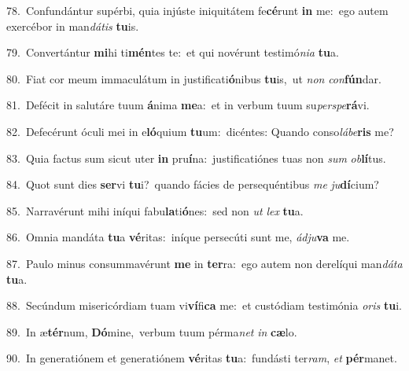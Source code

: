 {\numbfont\textcolor{\numbcolor}{78.}}~Confundántur supérbi, quia injúste iniquitátem fe\-\textbf{cé}\-runt \textbf{in} me:~\star ego autem exercébor in man\-\textit{dá}\-\textit{tis} \textbf{tu}\-is.\par
{\numbfont\textcolor{\numbcolor}{79.}}~Convertántur \textbf{mi}\-hi ti\-\textbf{mén}\-tes te:~\star et qui novérunt testimó\-\textit{ni}\-\textit{a} \textbf{tu}\-a.\par
{\numbfont\textcolor{\numbcolor}{80.}}~Fiat cor meum immaculátum in justificati\-\textbf{ó}\-nibus \textbf{tu}\-is,~\star ut \textit{non} \textit{con}\-\textbf{fún}dar.\par
{\numbfont\textcolor{\numbcolor}{81.}}~Defécit in salutáre tuum \textbf{á}\-nima \textbf{me}\-a:~\star et in verbum tuum su\-\textit{per}\-\textit{spe}\textbf{rá}vi.\par
{\numbfont\textcolor{\numbcolor}{82.}}~Defecérunt óculi mei in e\-\textbf{ló}\-quium \textbf{tu}\-um:~\star dicéntes: Quando conso\-\textit{lá}\-\textit{be}\textbf{ris} me?\par
{\numbfont\textcolor{\numbcolor}{83.}}~Quia factus sum sicut uter \textbf{in} pru\-\textbf{í}\-na:~\star justificatiónes tuas non \textit{sum} \textit{ob}\-\textbf{lí}tus.\par
{\numbfont\textcolor{\numbcolor}{84.}}~Quot sunt dies \textbf{ser}\-vi \textbf{tu}\-i?~\star quando fácies de persequéntibus \textit{me} \textit{ju}\-\textbf{dí}cium?\par
{\numbfont\textcolor{\numbcolor}{85.}}~Narravérunt mihi iníqui fabu\-\textbf{la}\-ti\-\textbf{ó}\-nes:~\star sed non \textit{ut} \textit{lex} \textbf{tu}\-a.\par
{\numbfont\textcolor{\numbcolor}{86.}}~Omnia mandáta \textbf{tu}\-a \textbf{vé}\-ritas:~\star iníque persecúti sunt me, \textit{ád}\-\textit{ju}\textbf{va} me.\par
{\numbfont\textcolor{\numbcolor}{87.}}~Paulo minus consummavérunt \textbf{me} in \textbf{ter}\-ra:~\star ego autem non derelíqui man\-\textit{dá}\-\textit{ta} \textbf{tu}\-a.\par
{\numbfont\textcolor{\numbcolor}{88.}}~Secúndum misericórdiam tuam vi\-\textbf{ví}\-fi\textbf{ca} me:~\star et custódiam testimónia \textit{o}\-\textit{ris} \textbf{tu}\-i.\par
{\numbfont\textcolor{\numbcolor}{89.}}~In æ\-\textbf{tér}\-num, \textbf{Dó}\-mine,~\star verbum tuum pérma\textit{net} \textit{in} \textbf{cæ}\-lo.\par
{\numbfont\textcolor{\numbcolor}{90.}}~In generatiónem et generatiónem \textbf{vé}\-ritas \textbf{tu}\-a:~\star fundásti ter\-\textit{ram}\-, \textit{et} \textbf{pér}\-manet.\par
